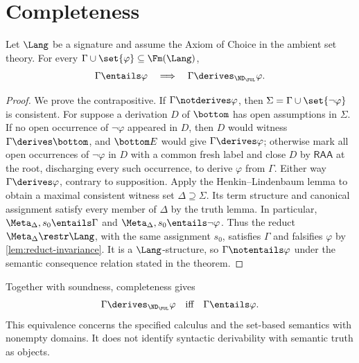 \section{Completeness}
\label{sec:fol-metatheory-03}

\begin{theorem}
\label{thm:fol-completeness}
Let \(\Lang\) be a signature and assume the Axiom of Choice in the
ambient set theory.  For every
\(\Gamma\cup\set{\varphi}\subseteq\Fm(\Lang)\),
\[
 \Gamma\entails\varphi
 \quad\Longrightarrow\quad
 \Gamma\derives_{\ND_{\FOL}}\varphi.
\]
\end{theorem}
\begin{proof}
We prove the contrapositive.  If \(\Gamma\notderives\varphi\), then
\(\Sigma=\Gamma\cup\set{\neg\varphi}\) is consistent.  For suppose a
derivation \(D\) of \(\bottom\) has open assumptions in \(\Sigma\).  If no
open occurrence of \(\neg\varphi\) appeared in \(D\), then \(D\) would
witness \(\Gamma\derives\bottom\), and \(\bottom E\) would give
\(\Gamma\derives\varphi\); otherwise mark all open occurrences of
\(\neg\varphi\) in \(D\) with a common fresh label and close \(D\) by
\(\mathsf{RAA}\) at the root, discharging every such occurrence, to
derive \(\varphi\) from \(\Gamma\).  Either way
\(\Gamma\derives\varphi\), contrary to supposition.  Apply the
Henkin--Lindenbaum lemma to obtain a maximal consistent witness set
\(\Delta\supseteq\Sigma\).  Its term structure and canonical assignment satisfy
every member of \(\Delta\) by the truth lemma.  In particular,
\(\Meta_\Delta,s_0\entails\Gamma\) and
\(\Meta_\Delta,s_0\entails\neg\varphi\).  Thus
the reduct \(\Meta_\Delta\restr\Lang\), with the same assignment \(s_0\),
satisfies \(\Gamma\) and falsifies \(\varphi\) by
\cref{lem:reduct-invariance}.  It is a \(\Lang\)-structure, so
\(\Gamma\notentails\varphi\) under the semantic consequence relation stated
in the theorem.
\end{proof}

Together with soundness, completeness gives
\[
 \Gamma\derives_{\ND_{\FOL}}\varphi
 \quad\text{iff}\quad
 \Gamma\entails\varphi.
\]
This equivalence concerns the specified calculus and the set-based semantics
with nonempty domains.  It does not identify syntactic derivability
with semantic truth as objects.

